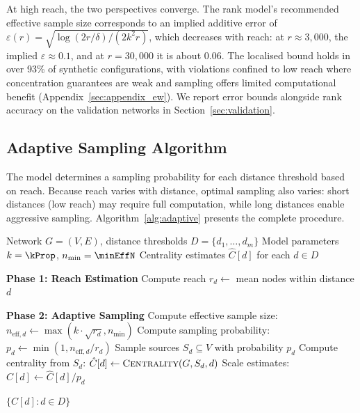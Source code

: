 At high reach, the two perspectives converge. The rank model's recommended effective sample size corresponds to an implied additive error of $\varepsilon(r) = \sqrt{\log(2r/\delta) / (2 k^2 r)}$, which decreases with reach: at $r \approx 3{,}000$, the implied $\varepsilon \approx 0.1$, and at $r = 30{,}000$ it is about 0.06. The localised bound holds in over 93\% of synthetic configurations, with violations confined to low reach where concentration guarantees are weak and sampling offers limited computational benefit (Appendix~\ref{sec:appendix_ew}). We report error bounds alongside rank accuracy on the validation networks in Section~\ref{sec:validation}.

\subsection{Adaptive Sampling Algorithm}

The model determines a sampling probability for each distance threshold based on reach. Because reach varies with distance, optimal sampling also varies: short distances (low reach) may require full computation, while long distances enable aggressive sampling. Algorithm~\ref{alg:adaptive} presents the complete procedure.

\begin{algorithm}[htbp]
  \caption{Adaptive Per-Distance Sampling for Network Centrality}
  \label{alg:adaptive}
  \begin{algorithmic}[1]
    \Require Network $G = (V, E)$, distance thresholds $D = \{d_1, \ldots, d_m\}$
    \Require Model parameters $k = \kProp$, $n_{\min} = \minEffN$
    \Ensure Centrality estimates $\hat{C}[d]$ for each $d \in D$

    \State \textbf{Phase 1: Reach Estimation}
    \State Compute reach $r_d \gets$ mean nodes within distance $d$
    \EndFor

    \State \textbf{Phase 2: Adaptive Sampling}
    \State Compute effective sample size: $n_{\text{eff},d} \gets \max(k \cdot \sqrt{r_d}, n_{\min})$
    \State Compute sampling probability: $p_d \gets \min(1, n_{\text{eff},d} / r_d)$
    \State Sample sources $S_d \subseteq V$ with probability $p_d$
    \State Compute centrality from $S_d$: $\hat{C}[d] \gets \textsc{Centrality}(G, S_d, d)$
    \State Scale estimates: $\hat{C}[d] \gets \hat{C}[d] / p_d$
    \EndFor

    \State \Return $\{\hat{C}[d] : d \in D\}$
  \end{algorithmic}
\end{algorithm}

